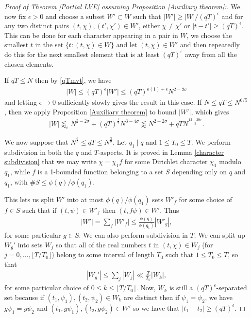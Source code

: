\documentclass[12pt]{amsart}
\theoremstyle{definition}
\theoremstyle{plain}
\theoremstyle{remark}
\numberwithin{equation}{section}
\numberwithin{theorem}{section}
\numberwithin{equation}{section}
\begin{document}
\begin{proof}[Proof of Theorem \ref{Partial LVE} assuming Proposition \ref{Auxiliary theorem}:]
		We now fix $\epsilon>0$ and choose a subset $W'\subset W$ such that
		$|W'|\geq |W|/(qT)^\epsilon$ and for any two distinct pairs
		$(t,\chi),(t',\chi')\in W'$, either $\chi\neq\chi'$ or $|t-t'|\geq(qT)^\epsilon$. This can be done for each character appearing in a pair in $W$, we choose the smallest $t$ in the set $\{t: (t,\chi) \in W\}$ and let $(t,\chi) \in W'$ and then repeatedly do this for the next smallest element that is at least $(qT)^{\epsilon}$ away from all the chosen elements. 
		
		If $qT \leq N$ then by \eqref{qTmvt}, we have 
		\begin{align*}
			|W| \leq (qT)^{\epsilon}|W'| \leq (qT)^{o(1)+\epsilon}N^{2-2\sigma}
		\end{align*}
		and letting $\epsilon \to 0$ sufficiently slowly gives the result in this case. If $N \leq qT \leq N^{6/5}$, then we apply Proposition \ref{Auxiliary theorem} to bound $|W'|$, which gives
		\begin{align*}
			|W| \lessapprox_{\epsilon} N^{2-2\sigma}+(qT)^{\frac{1}{2}} N^{3-4 \sigma} \lessapprox N^{2-2\sigma}+qTN^{\frac{12-20\sigma}{5}}. 
		\end{align*}
		
		We now suppose that $N^{\frac{6}{5}}\leq qT \leq N^{\frac{3}{2}}$. Let $q_1 \mid q$ and $1 \leq T_0 \leq T$. We perform subdivision in both the $q$ and $T$-aspects. It is proved in Lemma \ref{character subdivision} that we may write $\chi=\chi_1 f$ for some Dirichlet character $\chi_1$ modulo $q_1$, while $f$ is a 1-bounded function belonging to a set $S$ depending only on $q$ and $q_1$, with $\#S \leq \phi(q)/\phi(q_1)$.
		
		This lets us split $W'$ into at most $\phi(q)/\phi(q_1)$ sets $W'_{f}$ for some choice of $f \in S$ such that if $(t,\psi) \in W'_{f}$ then $(t,f\psi) \in W'$. Thus
		\begin{align*}
			|W'| = \sum_{f} |W'_f| \leq \frac{\phi(q)}{\phi(q_1)} |W'_{g}|,
		\end{align*}
		for some particular $g \in S$. We can also perform subdivision in $T$. We can split up $W_{g}'$ into sets $W_j$ so that all of the real numbers $t$ in $(t,\chi) \in W_j$ (for $j=0,\dots,\lfloor{T/T_0}\rfloor$) belong to some interval of length $T_0$ such that $1 \leq T_0 \leq T$, so that
		\begin{align*}
			|W_{g}'| \leq \sum_j |W_j| \ll \frac{T}{T_0} |W_k|,
		\end{align*}
		for some particular choice of $0\leq k \leq \lfloor{T/T_0\rfloor}$. Now, $W_{k}$ is still a $(qT)^{\epsilon}$-separated set because if $(t_1,\psi_1), (t_2,\psi_2) \in W_{k}$ are distinct then if $\psi_1=\psi_2$, we have $g \psi_1 = g \psi_2$ and $(t_1,g \psi_1), (t_2, g \psi_2) \in W'$ so we have that $|t_1 -t_2| \geq (qT)^{\epsilon}$.
		

\end{proof}
\end{document}
